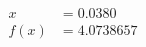 \documentclass[preview]{standalone}
\begin{document}
\begin{align*}
x &= 0.0380\\f(x) &= 4.0738657
\end{align*}
\end{document}
